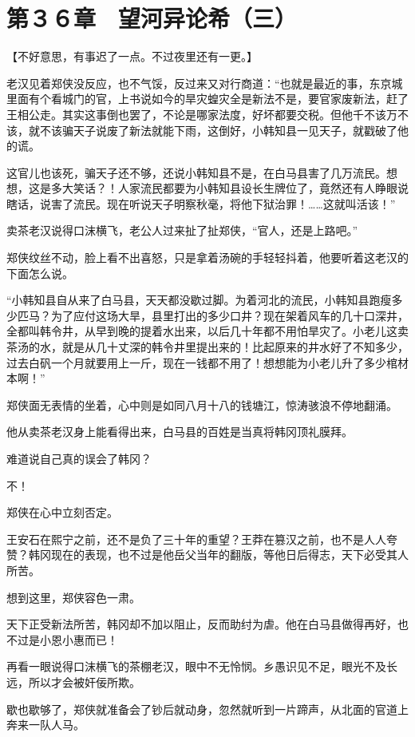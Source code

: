 \section{第３６章　望河异论希（三）}

【不好意思，有事迟了一点。不过夜里还有一更。】

老汉见着郑侠没反应，也不气馁，反过来又对行商道：“也就是最近的事，东京城里面有个看城门的官，上书说如今的旱灾蝗灾全是新法不是，要官家废新法，赶了王相公走。其实这事倒也罢了，不论是哪家法度，好坏都要交税。但他千不该万不该，就不该骗天子说废了新法就能下雨，这倒好，小韩知县一见天子，就戳破了他的谎。

这官儿也该死，骗天子还不够，还说小韩知县不是，在白马县害了几万流民。想想，这是多大笑话？！人家流民都要为小韩知县设长生牌位了，竟然还有人睁眼说瞎话，说害了流民。现在听说天子明察秋毫，将他下狱治罪！……这就叫活该！”

卖茶老汉说得口沫横飞，老公人过来扯了扯郑侠，“官人，还是上路吧。”

郑侠纹丝不动，脸上看不出喜怒，只是拿着汤碗的手轻轻抖着，他要听着这老汉的下面怎么说。

“小韩知县自从来了白马县，天天都没歇过脚。为着河北的流民，小韩知县跑瘦多少匹马？为了应付这场大旱，县里打出的多少口井？现在架着风车的几十口深井，全都叫韩令井，从早到晚的提着水出来，以后几十年都不用怕旱灾了。小老儿这卖茶汤的水，就是从几十丈深的韩令井里提出来的！比起原来的井水好了不知多少，过去白矾一个月就要用上一斤，现在一钱都不用了！想想能为小老儿升了多少棺材本啊！”

郑侠面无表情的坐着，心中则是如同八月十八的钱塘江，惊涛骇浪不停地翻涌。

他从卖茶老汉身上能看得出来，白马县的百姓是当真将韩冈顶礼膜拜。

难道说自己真的误会了韩冈？

不！

郑侠在心中立刻否定。

王安石在熙宁之前，还不是负了三十年的重望？王莽在篡汉之前，也不是人人夸赞？韩冈现在的表现，也不过是他岳父当年的翻版，等他日后得志，天下必受其人所苦。

想到这里，郑侠容色一肃。

天下正受新法所苦，韩冈却不加以阻止，反而助纣为虐。他在白马县做得再好，也不过是小恩小惠而已！

再看一眼说得口沫横飞的茶棚老汉，眼中不无怜悯。乡愚识见不足，眼光不及长远，所以才会被奸佞所欺。

歇也歇够了，郑侠就准备会了钞后就动身，忽然就听到一片蹄声，从北面的官道上奔来一队人马。


